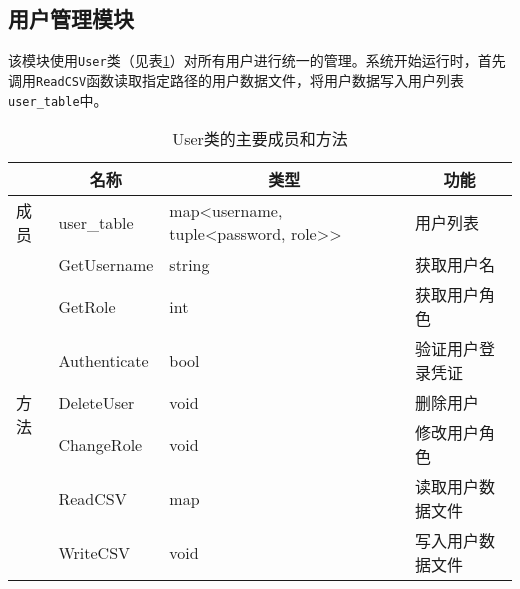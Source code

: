 \subsection{用户管理模块}

\par 该模块使用\texttt{User}类（见表\ref{table:User}）对所有用户进行统一的管理。系统开始运行时，首先调用\texttt{ReadCSV}函数读取指定路径的用户数据文件，将用户数据写入用户列表\texttt{user\_table}中。

\begin{table}[htb]
    \centering
    \caption{User类的主要成员和方法}
    \label{table:User}
    \begin{tabular}{|l|m{3cm}|m{4cm}|m{5cm}|}
        \hline
                            & \multicolumn{1}{c|}{名称}                & \multicolumn{1}{c|}{类型}                                        & \multicolumn{1}{c|}{功能}            \\
        \hline
        成员                  & \centering\arraybackslash user\_table  & \centering\arraybackslash map<username, tuple<password, role>> & \centering\arraybackslash 用户列表     \\ \hline
        \multirow{7}{*}{方法} & \centering\arraybackslash GetUsername  & \centering\arraybackslash string                               & \centering\arraybackslash 获取用户名    \\ \cline{2-4}
                            & \centering\arraybackslash GetRole      & \centering\arraybackslash int                                  & \centering\arraybackslash  获取用户角色  \\ \cline{2-4}
                            & \centering\arraybackslash Authenticate & \centering\arraybackslash bool                                 & \centering\arraybackslash 验证用户登录凭证 \\ \cline{2-4}
                            & \centering\arraybackslash DeleteUser   & \centering\arraybackslash void                                 & \centering\arraybackslash 删除用户     \\ \cline{2-4}
                            & \centering\arraybackslash ChangeRole   & \centering\arraybackslash void                                 & \centering\arraybackslash 修改用户角色   \\ \cline{2-4}
                            & \centering\arraybackslash ReadCSV      & \centering\arraybackslash map                                  & \centering\arraybackslash 读取用户数据文件 \\ \cline{2-4}
                            & \centering\arraybackslash WriteCSV     & \centering\arraybackslash void                                 & \centering\arraybackslash 写入用户数据文件 \\ \hline
    \end{tabular}
\end{table}

